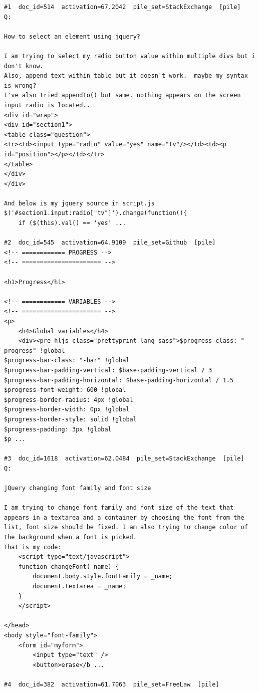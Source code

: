 \begin{verbatim}
#1  doc_id=514  activation=67.2042  pile_set=StackExchange  [pile]
Q:

How to select an element using jquery?

I am trying to select my radio button value within multiple divs but i don't know.
Also, append text within table but it doesn't work.  maybe my syntax is wrong?
I've also tried appendTo() but same. nothing appears on the screen
input radio is located..
<div id="wrap">
<div id="section1">
<table class="question">
<tr><td><input type="radio" value="yes" name="tv"/></td><td><p id="position"></p></td></tr>
</table>
</div>
</div>

And below is my jquery source in script.js
$('#section1.input:radio["tv"]').change(function(){
    if ($(this).val() == 'yes' ...

#2  doc_id=545  activation=64.9109  pile_set=Github  [pile]
<!-- ============ PROGRESS -->
<!-- ====================== -->

<h1>Progress</h1>

<!-- ============ VARIABLES -->
<!-- ====================== -->
<p>
	<h4>Global variables</h4>
	<div><pre hljs class="prettyprint lang-sass">$progress-class: "-progress" !global
$progress-bar-class: "-bar" !global
$progress-bar-padding-vertical: $base-padding-vertical / 3
$progress-bar-padding-horizontal: $base-padding-horizontal / 1.5
$progress-font-weight: 600 !global
$progress-border-radius: 4px !global
$progress-border-width: 0px !global
$progress-border-style: solid !global
$progress-padding: 3px !global
$p ...

#3  doc_id=1618  activation=62.0484  pile_set=StackExchange  [pile]
Q:

jQuery changing font family and font size

I am trying to change font family and font size of the text that appears in a textarea and a container by choosing the font from the list, font size should be fixed. I am also trying to change color of the background when a font is picked. 
That is my code:
    <script type="text/javascript">     
    function changeFont(_name) {
        document.body.style.fontFamily = _name;
        document.textarea = _name;
    } 
    </script>

</head>
<body style="font-family">   
    <form id="myform">
        <input type="text" /> 
        <button>erase</b ...

#4  doc_id=382  activation=61.7063  pile_set=FreeLaw  [pile]




\end{verbatim}
